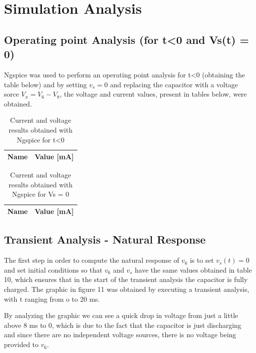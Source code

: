 \section{Simulation Analysis}
\label{sec:simulation}

\subsection{Operating point Analysis (for t<0 and Vs(t) = 0)}

Ngspice was used to perform an operating point analysis for t<0 (obtaining the table below) and by setting $v_s = 0$ and replacing the capacitor with a voltage sorce $V_x = V_6 - V_8$, the voltage and current values, present in tables below, were obtained.

\begin{table}[H]
	\centering
	\begin{tabular}{|l|r|}
		\hline    
		{\bf Name} & {\bf Value [mA]} \\ \hline
		
	\end{tabular}
	\caption{Current and voltage results obtained with Ngspice for t<0 }
	\label{tab:op}
\end{table}



\begin{table}[H]
	\centering
	\begin{tabular}{|l|r|}
		\hline    
		{\bf Name} & {\bf Value [mA]} \\ \hline
		
	\end{tabular}
	\caption{Current and voltage results obtained with Ngspice for Vs = 0}
	\label{tab:op}
\end{table}


\subsection{Transient Analysis - Natural Response}

The first step in order to compute the natural response of $v_6$ is to set $v_s(t) = 0$ and set initial conditions so that $v_6$ and $v_s$ have the same values obtained in table 10, which ensures that in the start of the transient analysis the capacitor is fully charged. The graphic in figure 11 was obtained by executing a transient analysis, with t ranging from o to 20 ms.

By analyzing the graphic we can see a quick drop in voltage from just a little above 8 ms to 0, which is due to the fact that the capacitor is just discharging and since there are no independent voltage sources, there is no voltage being provided to $v_6$.

